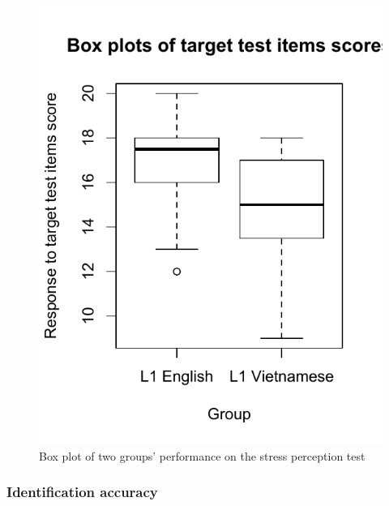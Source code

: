 \documentclass[a4paper]{article}
\begin{document}
\begin{figure}[H]
\begin{center}  
\includegraphics[scale=0.7]{stressboxplot.pdf} 
\caption{Box plot of two groups' performance on the stress perception test}
\label{fig:stressboxplot}
\end{center}   
\end{figure}
 


\subsubsection{Identification accuracy}
\end{document}

